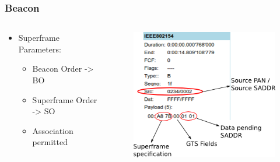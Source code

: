 \begin{frame}[fragile]
  \frametitle{Beacon}
  \begin{columns}
    \begin{column}{.58\linewidth}
      \begin{itemize}
      	\item Superframe Parameters:
      	\begin{itemize}
	  \item Beacon Order -> BO
	  \item Superframe Order -> SO
	  \item Association permitted
      	\end{itemize}
      \end{itemize}
    \end{column}
    \hfill
    \begin{column}{.4\linewidth}
      \begin{figure}
	\includegraphics[width=\textwidth]{img/beacon.png}
      \end{figure}
    \end{column}
  \end{columns}
\end{frame}


